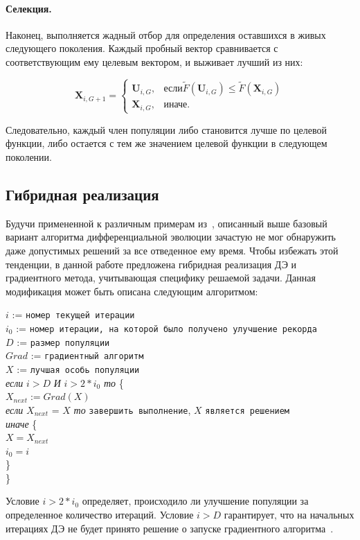 \documentclass{llncs}
\begin{document}
\paragraph*{Селекция.}

Наконец, выполняется жадный отбор для определения оставшихся в живых следующего поколения. Каждый пробный вектор сравнивается с соответствующим ему целевым вектором, и выживает лучший из них:

\begin{equation}\label{eq:de_sel}
  \textbf{X}_{i,G+1} =
  \begin{cases}
    \textbf{U}_{i,G}, & \mbox{если} \tilde{F}(\textbf{U}_{i,G}) \leq \tilde{F}(\textbf{X}_{i,G}) \\
    \textbf{X}_{i,G}, & \mbox{иначе}.
  \end{cases}
\end{equation}

Следовательно, каждый член популяции либо становится лучше по целевой функции, либо остается с тем же значением целевой функции в следующем поколении.

\subsection{Гибридная реализация}
Будучи примененной к различным примерам из~\cite{tyunin:daor}, описанный выше базовый вариант алгоритма  дифференциальной эволюции зачастую не мог обнаружить даже допустимых решений за все отведенное ему время. Чтобы избежать этой тенденции, в данной работе предложена гибридная реализация ДЭ и градиентного метода, учитывающая специфику решаемой задачи. Данная модификация может быть описана следующим алгоритмом:

\begin{flushleft}
\small
$i$ := \verb"номер текущей итерации" \\
$i_0$ := \verb"номер итерации, на которой было получено улучшение рекорда"\\
$D$ := \verb"размер популяции"\\
$Grad$ := \verb"градиентный алгоритм"\\
$X$ := \verb"лучшая особь популяции"\\

\textit{если} $i > D$ \textit{И} $i > 2 * i_0$ \textit{то} \{\\
\leftskip=12pt
    $X_{next} := Grad(X)$\\
    \textit{если} $X_{next}$ = $X$ \textit{то} \verb"завершить выполнение", $X$ \verb"является решением"\\
    \textit{иначе} \{\\
    \leftskip=24pt
        $X = X_{next}$\\
        $i_0 = i$\\
        \leftskip=12pt
    \}\\
    \leftskip=0pt
\}
\end{flushleft}
Условие $i > 2 * i_0$ определяет, происходило ли улучшение популяции за определенное количество итераций. Условие $i > D$ гарантирует, что на начальных итерациях ДЭ не будет принято решение о запуске градиентного алгоритма~\cite{eremeev:restart}.
\end{document}
